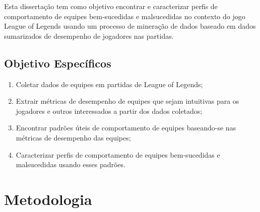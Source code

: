 Esta dissertação tem como objetivo encontrar e caracterizar perfis de comportamento de equipes bem-sucedidas e malsucedidas no contexto do jogo League of Legends usando um processo de minera\c{c}\~ao de dados baseado em dados sumarizados de desempenho de jogadores nas partidas.

\subsection{Objetivo Específicos}

\begin{enumerate}[label=(\roman*)]
  \item Coletar dados de equipes em partidas de League of Legends;
  \item Extrair métricas de desempenho de equipes que sejam intuitivas para os jogadores e outros interessados a partir dos dados coletados;
  \item Encontrar padrões úteis de comportamento de equipes baseando-se nas métricas de desempenho das equipes;
  \item Caracterizar perfis de comportamento de equipes bem-sucedidas e malsucedidas usando esses padrões.
\end{enumerate}

\section{Metodologia}

